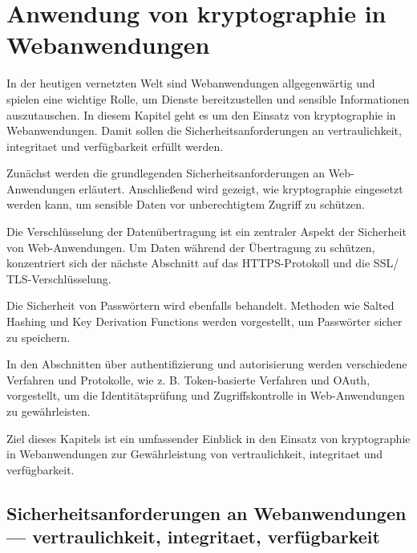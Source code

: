 \newpage
\section[Anwendung von Kryptograpihe in Webanwendungen]{Anwendung von \gls{kryptographie} in Webanwendungen}\label{sec:anwendung_von_kryptographie_in_webanwendungen}
In der heutigen vernetzten Welt sind Webanwendungen allgegenwärtig und spielen eine wichtige Rolle, um Dienste bereitzustellen und sensible Informationen auszutauschen. In diesem Kapitel geht es um den Einsatz von \gls{kryptographie} in Webanwendungen. Damit sollen die Sicherheitsanforderungen an \gls{vertraulichkeit}, \gls{integritaet} und \gls{verfügbarkeit} erfüllt werden.

Zunächst werden die grundlegenden Sicherheitsanforderungen an Web-Anwendungen erläutert. Anschließend wird gezeigt, wie \gls{kryptographie} eingesetzt werden kann, um sensible Daten vor unberechtigtem Zugriff zu schützen.

Die Verschlüsselung der Datenübertragung ist ein zentraler Aspekt der Sicherheit von Web-Anwendungen. Um Daten während der Übertragung zu schützen, konzentriert sich der nächste Abschnitt auf das \ac{HTTPS}-Protokoll und die \ac{SSL}/ \acf{TLS}-Verschlüsselung.

Die Sicherheit von Passwörtern wird ebenfalls behandelt. Methoden wie Salted Hashing und Key Derivation Functions werden vorgestellt, um Passwörter sicher zu speichern.

In den Abschnitten über \gls{authentifizierung} und \gls{autorisierung} werden verschiedene Verfahren und Protokolle, wie z. B. Token-basierte Verfahren und OAuth, vorgestellt, um die Identitätsprüfung und Zugriffskontrolle in Web-Anwendungen zu gewährleisten.

Ziel dieses Kapitels ist ein umfassender Einblick in den Einsatz von \gls{kryptographie} in Webanwendungen zur Gewährleistung von \gls{vertraulichkeit}, \gls{integritaet} und \gls{verfügbarkeit}. 

\subsection[Sicherheitsanforderungen an Webanwendungen]{Sicherheitsanforderungen an Webanwendungen — \gls{vertraulichkeit}, \gls{integritaet}, \gls{verfügbarkeit}}

